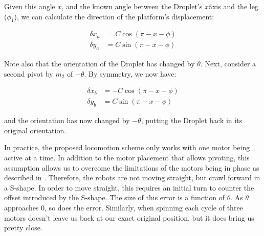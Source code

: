\documentclass[letterpaper, 10pt, conference]{ieeeconf}
\begin{document}
Given this angle $x$, and the known angle between the Droplet's $x$\~axis and the leg ($\phi_1$), we can calculate the direction of the platform's displacement:

\begin{align}
\delta x_a &= C \cos(\pi - x - \phi)\\
\nonumber
\delta y_a &= C \sin(\pi - x - \phi)
\end{align}

Note also that the orientation of the Droplet has changed by $\theta$. Next, consider a second pivot by $m_2$ of $-\theta$. By symmetry, we now have:

\begin{align}
\delta x_b &= -C\cos(\pi -x -\phi)\\
\nonumber
\delta y_b &= C \sin(\pi - x - \phi)
\end{align}

and the orientation has now changed by $-\theta$, putting the Droplet back in its original orientation. 

In practice, the proposed locomotion scheme only works with one motor being active at a time. In addition to the motor placement that allows pivoting, this assumption allows us to overcome the limitations of the motors being in phase as described in \cite{Vartholomeos2005}. Therefore, the robots are not moving straight, but crawl forward in a S-shape. In order to move straight, this requires an initial turn to counter the offset introduced by the S-shape. The size of this error is a function of $\theta$. As $\theta$ approaches $0$, so does the error. Similarly, when spinning each cycle of three motors doesn't leave us back at our exact original position, but it does bring us pretty close.


\end{document}
